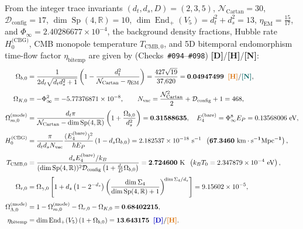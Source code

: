 \documentclass[11pt,a4paper]{article}
\newcommand{\catD}{\textbf{\textcolor{blue!75!black}{[D]}}}
\newcommand{\catH}{\textbf{\textcolor{orange!85!black}{[H]}}}
\newcommand{\catN}{\textbf{\textcolor{teal!75!black}{[N]}}}
\theoremstyle{plain}
\theoremstyle{definition}
\theoremstyle{remark}
\numberwithin{equation}{section}
\begin{document}
From the integer trace invariants $(d_t, d_s, D) = (2, 3, 5)$, $\mathcal{N}_{\text{Cartan}} = 30$, $\mathcal{D}_{\text{config}} = 17$, $\dim\operatorname{Sp}(4,\mathbb{R}) = 10$, $\dim\operatorname{End}_+(V_5) = d_t^2 + d_s^2 = 13$, $\eta_{\text{EM}} = \frac{15}{17}$, and $\Phi_{\infty} = 2.40286677 \times 10^{-4}$, the background density fractions, Hubble rate $H_0^{\text{(CBG)}}$, CMB monopole temperature $T_{\text{CMB},0}$, and 5D bitemporal endomorphism time-flow factor $\eta_{\text{bitemp}}$ are given by (Checks~\texttt{\#094}--\texttt{\#098}) \catD/\catH/\catN:
\begin{align}
  \Omega_{b,0} &= \frac{1}{2d_t\sqrt{d_t d_s^2 + 1}}\left(1 - \frac{d_t^2}{\mathcal{N}_{\text{Cartan}} - \eta_{\text{EM}}}\right) = \frac{427\sqrt{19}}{37{,}620} = \mathbf{0.04947499} \;\;\catH/\catN, \nonumber \\[3pt]
  \Omega_{K,0} &= -\Phi_{\infty}^2 = -5.77376871 \times 10^{-8}, \qquad N_{\text{vac}} = \frac{\mathcal{N}_{\text{Cartan}}^2}{2} + \mathcal{D}_{\text{config}} + 1 = 468, \nonumber \\[3pt]
  \Omega_{m,0}^{\text{(mode)}} &= \frac{d_t\pi}{\mathcal{N}_{\text{Cartan}} - \dim\operatorname{Sp}(4,\mathbb{R})}\left(1 + \frac{\Omega_{b,0}}{d_s^2}\right) = \mathbf{0.31588635}, \quad E_4^{\text{(bare)}} = \Phi_{\infty}^8 E_P = 0.13568006\text{ eV}, \nonumber \\[3pt]
  H_0^{\text{(CBG)}} &= \frac{\pi}{d_t d_s N_{\text{vac}}}\frac{(E_4^{\text{(bare)}})^2}{\hbar E_P}\left(1 - d_s\Omega_{b,0}\right) = 2.182537 \times 10^{-18}\text{ s}^{-1} \;\; \left(\mathbf{67.3460\text{ km}\cdot\text{s}^{-1}\text{Mpc}^{-1}}\right), \nonumber \\[3pt]
  T_{\text{CMB},0} &= \frac{d_s E_4^{\text{(bare)}}/k_B}{(\dim\operatorname{Sp}(4,\mathbb{R}))^2\mathcal{D}_{\text{config}}\left(1 + \frac{d_t}{D}\Omega_{b,0}\right)} = \mathbf{2.724600\text{ K}} \;\; \left(k_B T_0 = 2.347879 \times 10^{-4}\text{ eV}\right), \nonumber \\[3pt]
  \Omega_{r,0} &= \Omega_{\gamma,0}\left[1 + d_s\left(1 - 2^{-d_s}\right)\left(\frac{\dim\Sigma_4}{\dim\operatorname{Sp}(4,\mathbb{R}) + 1}\right)^{\!\dim\Sigma_4/d_s}\right] = 9.15602 \times 10^{-5}, \nonumber \\[3pt]
  \Omega_{\Lambda,0}^{\text{(mode)}} &= 1 - \Omega_{m,0}^{\text{(mode)}} - \Omega_{r,0} - \Omega_{K,0} = \mathbf{0.68402215}, \nonumber \\[3pt]
  \eta_{\text{bitemp}} &= \dim\operatorname{End}_+(V_5)\left(1 + \Omega_{b,0}\right) = \mathbf{13.643175} \;\;\catD/\catH.
  \label{eq:deductive_background_closure_p3}
\end{align}
\end{document}
